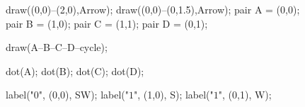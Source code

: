 \documentclass[../textbook.tex]{subfiles}
\begin{document}

\begin{figure}[h]
	\begin{center}
		\begin{minipage}[b]{\textwidth}
			\centering
			\begin{asy}[width=0.3\textwidth]
			draw((0,0)--(2,0),Arrow);
			draw((0,0)--(0,1.5),Arrow);
			pair A = (0,0);
			pair B = (1,0);
			pair C = (1,1);
			pair D = (0,1);
			
			draw(A--B--C--D--cycle);
			
			dot(A);
			dot(B);
			dot(C);
			dot(D);
			
			label("$0$", (0,0), SW);
			label("$1$", (1,0), S);
			label("$1$", (0,1), W);
			\end{asy}
		\end{minipage}
	\end{center}
	\vspace*{-2\baselineskip}
	\begin{center}
		\begin{minipage}[t]{\textwidth}
			\label{fig:unit_square}
		\end{minipage}
	\end{center}
	\vspace*{-2\baselineskip}
\end{figure}
\end{document}
